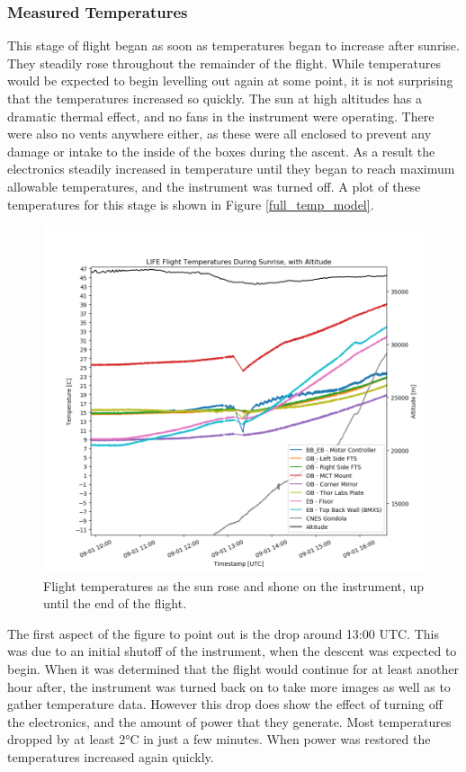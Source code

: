 \subsubsection{Measured Temperatures}
This stage of flight began as soon as temperatures began to increase after sunrise. They steadily rose throughout the remainder of the flight. While temperatures would be expected to begin levelling out again at some point, it is not surprising that the temperatures increased so quickly. The sun at high altitudes has a dramatic thermal effect, and no fans in the instrument were operating. There were also no vents anywhere either, as these were all enclosed to prevent any damage or intake to the inside of the boxes during the ascent. As a result the electronics steadily increased in temperature until they began to reach maximum allowable temperatures, and the instrument was turned off. A plot of these temperatures for this stage is shown in Figure \ref{full_temp_model}.

\begin{figure}
    \centering
    \includegraphics[width=\textwidth]{chap4_images/sunrise_images/Sunrise_temps_no_sims_V2.png}
    \caption{Flight temperatures as the sun rose and shone on the instrument, up until the end of the flight.}
    \label{fig:sunrise_temps_no_sims}
\end{figure}

The first aspect of the figure to point out is the drop around 13:00 UTC. This was due to an initial shutoff of the instrument, when the descent was expected to begin. When it was determined that the flight would continue for at least another hour after, the instrument was turned back on to take more images as well as to gather temperature data. However this drop does show the effect of turning off the electronics, and the amount of power that they generate. Most temperatures dropped by at least 2°C in just a few minutes. When power was restored the temperatures increased again quickly. 

